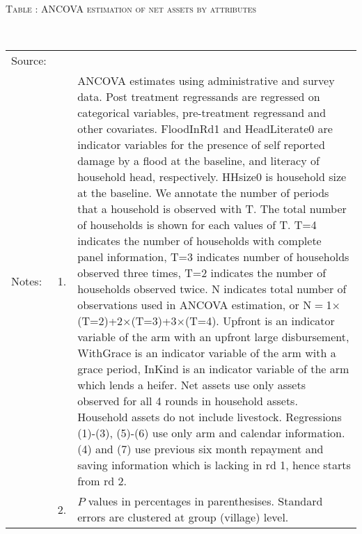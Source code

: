 \hspace{-1cm}\begin{minipage}[t]{14cm}
\hfil\textsc{\normalsize Table \thetable: ANCOVA estimation of net assets by attributes\label{tab ANCOVA narrow net assets attributes}}\\
\setlength{\tabcolsep}{1pt}
\setlength{\baselineskip}{8pt}
\renewcommand{\arraystretch}{.55}
\hfil{}\\
\renewcommand{\arraystretch}{.8}
\setlength{\tabcolsep}{1pt}
\begin{tabular}{>{\hfill\scriptsize}p{1cm}<{}>{\hfill\scriptsize}p{.25cm}<{}>{\scriptsize}p{12cm}<{\hfill}}
Source:& \multicolumn{2}{l}{\scriptsize Estimated with GUK administrative and survey data.}\\
Notes: & 1. & ANCOVA estimates using administrative and survey data. Post treatment regressands are regressed on categorical variables, pre-treatment regressand and other covariates. \textsf{FloodInRd1} and \textsf{HeadLiterate0} are indicator variables for the presence of self reported damage by a flood at the baseline, and literacy of household head, respectively. \textsf{HHsize0} is household size at the baseline. We annotate the number of periods that a household is observed with \textsf{T}. The total number of households is shown for each values of \textsf{T}. \textsf{T=4} indicates the number of households with complete panel information, \textsf{T=3} indicates number of households observed three times, \textsf{T=2} indicates the number of households observed twice. \textsf{N} indicates total number of observations used in ANCOVA estimation, or \textsf{N$=$1$\times$(T=2)+2$\times$(T=3)+3$\times$(T=4)}.  \textsf{Upfront} is an indicator variable of the arm with an upfront large disbursement, \textsf{WithGrace} is an indicator variable of the arm with a grace period, \textsf{InKind} is an indicator variable of the arm which lends a heifer. Net assets use only assets observed for all 4 rounds in household assets. Household assets do not include livestock. Regressions (1)-(3), (5)-(6) use only arm and calendar information. (4) and (7) use previous six month repayment and saving information which is lacking in rd 1, hence starts from rd 2.\\
& 2. & $P$ values in percentages in parenthesises. Standard errors are clustered at group (village) level.
\end{tabular}
\end{minipage}

